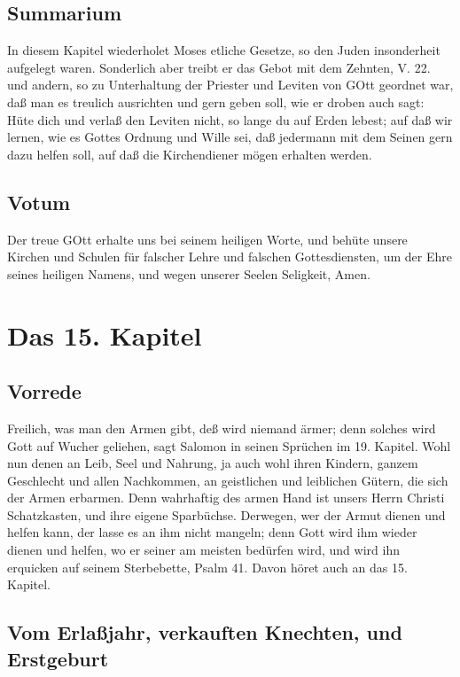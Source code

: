 \section{Summarium}

In diesem Kapitel wiederholet Moses etliche Gesetze, so den Juden insonderheit aufgelegt waren. Sonderlich aber treibt er das Gebot mit dem Zehnten, V. 22. und andern, so zu Unterhaltung der Priester und Leviten von GOtt geordnet war, daß man es treulich ausrichten und gern geben soll, wie er droben auch sagt: Hüte dich und verlaß den Leviten nicht, so lange du auf Erden lebest; auf daß wir lernen, wie es Gottes Ordnung und Wille sei, daß jedermann mit dem Seinen gern dazu helfen soll, auf daß die Kirchendiener mögen erhalten werden.

\section{Votum}

Der treue GOtt erhalte uns bei seinem heiligen Worte, und behüte unsere Kirchen und Schulen für falscher Lehre und falschen Gottesdiensten, um der Ehre seines heiligen Namens, und wegen unserer Seelen Seligkeit, Amen.

\chapter{Das 15. Kapitel}

\section{Vorrede}

Freilich, was man den Armen gibt, deß wird niemand ärmer; denn solches wird Gott auf Wucher geliehen, sagt Salomon in seinen Sprüchen im 19. Kapitel. Wohl nun denen an Leib, Seel und Nahrung, ja auch wohl ihren Kindern, ganzem Geschlecht und allen Nachkommen, an geistlichen und leiblichen Gütern, die sich der Armen erbarmen. Denn wahrhaftig des armen Hand ist unsers Herrn Christi Schatzkasten, und ihre eigene Sparbüchse. Derwegen, wer der Armut dienen und helfen kann, der lasse es an ihm nicht mangeln; denn Gott wird ihm wieder dienen und helfen, wo er seiner am meisten bedürfen wird, und wird ihn erquicken auf seinem Sterbebette, Psalm 41. Davon höret auch an das 15. Kapitel.

\section{Vom Erlaßjahr, verkauften Knechten, und Erstgeburt}

